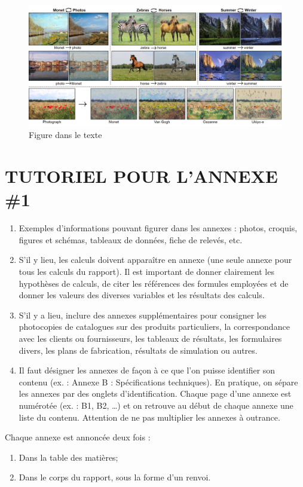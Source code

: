 \documentclass[12pt]{article}
\begin{document}
	\begin{figure}[!h]
		\begin{center}
			\includegraphics[scale=0.4]{../img/gan_img.jpg}
		\end{center}
		\caption{Figure dans le texte~\cite{CycleGAN2017}}
		\label{fig:gan}
	\end{figure}
	\newpage
	\appendix

	\section{TUTORIEL POUR L'ANNEXE \#1}
	\label{appendix:consigne}
	\begin{enumerate}
		\item Exemples d’informations pouvant figurer dans les annexes : photos, croquis, figures
			et schémas, tableaux de données, fiche de relevés, etc.

		\item S’il y lieu, les calculs doivent apparaître en annexe (une seule annexe pour tous
			les calculs du rapport). Il est important de donner clairement les hypothèses de calculs,
			de citer les références des formules employées et de donner les valeurs des
			diverses variables et les résultats des calculs.

		\item S’il y a lieu, inclure des annexes supplémentaires pour consigner les
			photocopies de catalogues sur des produits particuliers, la correspondance avec les
			clients ou fournisseurs, les tableaux de résultats, les formulaires divers, les
			plans de fabrication, résultats de simulation ou autres.

		\item Il faut désigner les annexes de façon à ce que l’on puisse identifier son contenu
			(ex. : Annexe B : Spécifications techniques). En pratique, on sépare les annexes
			par des onglets d’identification. Chaque page d’une annexe est numérotée (ex. : B1,
			B2, …) et on retrouve au début de chaque annexe une liste du contenu. Attention de
			ne pas multiplier les annexes à outrance.
	\end{enumerate}
	Chaque annexe est annoncée deux fois :
	\begin{enumerate}
		\item Dans la table des matières;

		\item Dans le corps du rapport, sous la forme d’un renvoi.
	\end{enumerate}
\end{document}
